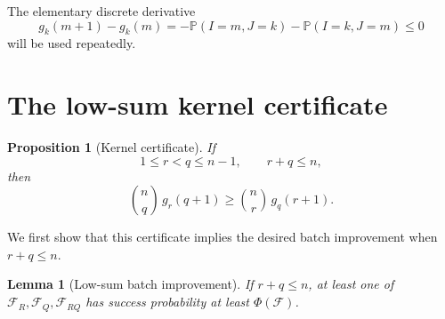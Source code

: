 \documentclass[11pt]{article}
\newtheorem{lemma}[theorem]{Lemma}
\newtheorem{proposition}[theorem]{Proposition}
\newcommand{\PP}{\mathbb P}
\newcommand{\cF}{\mathcal F}
\newcommand{\1}{\mathbf 1}
\begin{document}
The elementary discrete derivative
\begin{equation}\label{eq:g-monotone}
g_k(m+1)-g_k(m)
=-\PP(I=m,J=k)-\PP(I=k,J=m)
\leq0
\end{equation}
will be used repeatedly.

\section{The low-sum kernel certificate}

\begin{proposition}[Kernel certificate]\label{prop:certificate}
If
\[
1\leq r<q\leq n-1,
\qquad
r+q\leq n,
\]
then
\begin{equation}\label{eq:certificate}
\boxed{\binom nq\,g_r(q+1)
\geq
\binom nr\,g_q(r+1).}
\end{equation}
\end{proposition}

We first show that this certificate implies the desired batch
improvement when $r+q\leq n$.

\begin{lemma}[Low-sum batch improvement]\label{lem:low-sum}
If $r+q\leq n$, at least one of $\cF_R,\cF_Q,\cF_{RQ}$ has success
probability at least $\Phi(\cF)$.
\end{lemma}
\end{document}
